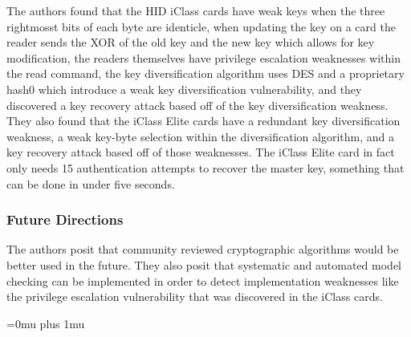 \noindent
The authors found that the HID iClass cards have weak keys when the three rightmosst bits of each byte are identicle, when updating the key on a card the reader sends the XOR of the old key and the new key which allows for key modification, the readers themselves have privilege escalation weaknesses within the read command, the key diversification algorithm uses DES and a proprietary hash0 which introduce a weak key diversification vulnerability, and they discovered a key recovery attack based off of the key diversification weakness.  They also found that the iClass Elite cards have a redundant key diversification weakness, a weak key-byte selection within the diversification algorithm, and a key recovery attack based off of those weaknesses.  The iClass Elite card in fact only needs 15 authentication attempts to recover the master key, something that can be done in under five seconds.

\subsubsection{Future Directions}

\noindent
The authors posit that community reviewed cryptographic algorithms would be better used in the future.  They also posit that systematic and automated model checking can be implemented in order to detect implementation weaknesses like the privilege escalation vulnerability that was discovered in the iClass cards.

\Urlmuskip=0mu plus 1mu\relax
\pagebreak
